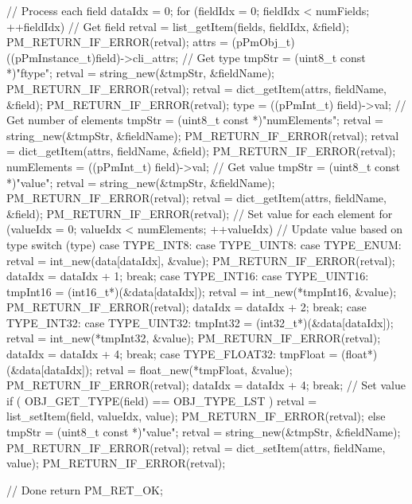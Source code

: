 \begin{DoxyVerb}
// Process each field
dataIdx = 0;
for (fieldIdx = 0; fieldIdx < numFields; ++fieldIdx)
{               
        // Get field
        retval = list_getItem(fields, fieldIdx, &field); PM_RETURN_IF_ERROR(retval);
        attrs = (pPmObj_t)((pPmInstance_t)field)->cli_attrs;
        // Get type
        tmpStr = (uint8_t const *)"ftype";
        retval = string_new(&tmpStr, &fieldName); PM_RETURN_IF_ERROR(retval); 
        retval = dict_getItem(attrs, fieldName, &field); PM_RETURN_IF_ERROR(retval);
        type = ((pPmInt_t) field)->val;   
        // Get number of elements
        tmpStr = (uint8_t const *)"numElements";
        retval = string_new(&tmpStr, &fieldName); PM_RETURN_IF_ERROR(retval); 
        retval = dict_getItem(attrs, fieldName, &field); PM_RETURN_IF_ERROR(retval);
        numElements = ((pPmInt_t) field)->val;
        // Get value
        tmpStr = (uint8_t const *)"value";
        retval = string_new(&tmpStr, &fieldName); PM_RETURN_IF_ERROR(retval); 
        retval = dict_getItem(attrs, fieldName, &field); PM_RETURN_IF_ERROR(retval); 
        // Set value for each element
        for (valueIdx = 0; valueIdx < numElements; ++valueIdx)
        {               
// Update value based on type           
switch (type)  
{
        case TYPE_INT8: 
        case TYPE_UINT8:
        case TYPE_ENUM: 
                retval = int_new(data[dataIdx], &value); PM_RETURN_IF_ERROR(retval);                       
                dataIdx = dataIdx + 1;
                break;
        case TYPE_INT16:
        case TYPE_UINT16:
                tmpInt16 = (int16_t*)(&data[dataIdx]);
                retval = int_new(*tmpInt16, &value); PM_RETURN_IF_ERROR(retval);    
                dataIdx = dataIdx + 2;
                break;       
        case TYPE_INT32:
        case TYPE_UINT32:
                tmpInt32 = (int32_t*)(&data[dataIdx]);
                retval = int_new(*tmpInt32, &value); PM_RETURN_IF_ERROR(retval);    
                dataIdx = dataIdx + 4;
                break;  
        case TYPE_FLOAT32:
                tmpFloat = (float*)(&data[dataIdx]);
                retval = float_new(*tmpFloat, &value); PM_RETURN_IF_ERROR(retval);    
                dataIdx = dataIdx + 4;
                break;    
}
// Set value 
if ( OBJ_GET_TYPE(field) == OBJ_TYPE_LST )
{
        retval = list_setItem(field, valueIdx, value); PM_RETURN_IF_ERROR(retval); 
}
else
{
        tmpStr = (uint8_t const *)"value";
        retval = string_new(&tmpStr, &fieldName); PM_RETURN_IF_ERROR(retval); 
        retval = dict_setItem(attrs, fieldName, value); PM_RETURN_IF_ERROR(retval); 
}
        }
}

// Done
return PM_RET_OK;
\end{DoxyVerb}
 

